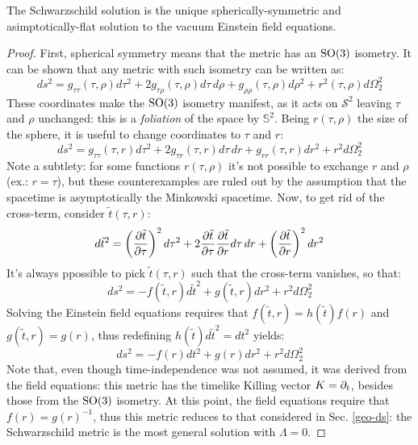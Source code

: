 \begin{theorem}[Birkhoff]
  The Schwarzschild solution is the unique spherically-symmetric and asimptotically-flat solution to the vacuum Einstein field equations.
\end{theorem}
\begin{proof}
  First, spherical symmetry means that the metric has an $ \mathrm{SO}(3) $ isometry. It can be shown that any metric with such isometry can be written as:
  \begin{equation*}
    ds^2 = g_{\tau \tau}(\tau, \rho) d\tau^2 + 2 g_{\tau \rho}(\tau, \rho) d\tau\,d\rho + g_{\rho \rho}(\tau, \rho) d\rho^2 + r^2(\tau, \rho) d\Omega_2^2
  \end{equation*}
  These coordinates make the $ \mathrm{SO}(3) $ isometry manifest, as it acts on $ \mathcal{S}^2 $ leaving $ \tau $ and $ \rho $ unchanged: this is a \textit{foliation} of the space by $ \mathbb{S}^2 $. Being $ r(\tau,\rho) $ the size of the sphere, it is useful to change coordinates to $ \tau $ and $ r $:
  \begin{equation*}
    ds^2 = g_{\tau \tau}(\tau,r) d\tau^2 + 2g_{\tau r}(\tau,r) d\tau\,dr + g_{rr}(\tau,r) dr^2 + r^2 d\Omega_2^2
  \end{equation*}
  Note a subtlety: for some functions $ r(\tau,\rho) $ it's not possible to exchange $ r $ and $ \rho $ (ex.: $ r = \tau $), but these counterexamples are ruled out by the assumption that the spacetime is asymptotically the Minkowski spacetime. Now, to get rid of the cross-term, consider $ \tilde{t}(\tau,r) $:
  \begin{equation*}
    d\tilde{t}^2 = \left( \frac{\partial \tilde{t}}{\partial \tau} \right)^2 d\tau^2 + 2 \frac{\partial \tilde{t}}{\partial \tau} \frac{\partial \tilde{t}}{\partial r} d\tau\,dr + \left( \frac{\partial \tilde{t}}{\partial r} \right)^2 dr^2
  \end{equation*}
  It's always ppossible to pick $ \tilde{t}(\tau,r) $ such that the cross-term vanishes, so that:
  \begin{equation*}
    ds^2 = - f(\tilde{t},r) d\tilde{t}^2 + g(\tilde{t},r) dr^2 + r^2 d\Omega_2^2
  \end{equation*}
  Solving the Einstein field equations requires that $ f(\tilde{t},r) = h(\tilde{t}) f(r) $ and $ g(\tilde{t},r) = g(r) $, thus redefining $ h(\tilde{t}) d\tilde{t}^2 = dt^2 $ yields:
  \begin{equation*}
    ds^2 = - f(r) dt^2 + g(r) dr^2 + r^2 d\Omega_2^2
  \end{equation*}
  Note that, even though time-independence was not assumed, it was derived from the field equations: this metric has the timelike Killing vector $ K = \partial_t $, besides those from the $ \mathrm{SO}(3) $ isometry. At this point, the field equations require that $ f(r) = g(r)^{-1} $, thus this metric reduces to that considered in Sec. \ref{geo-ds}: the Schwarzschild metric is the most general solution with $ \Lambda = 0 $.
\end{proof}

